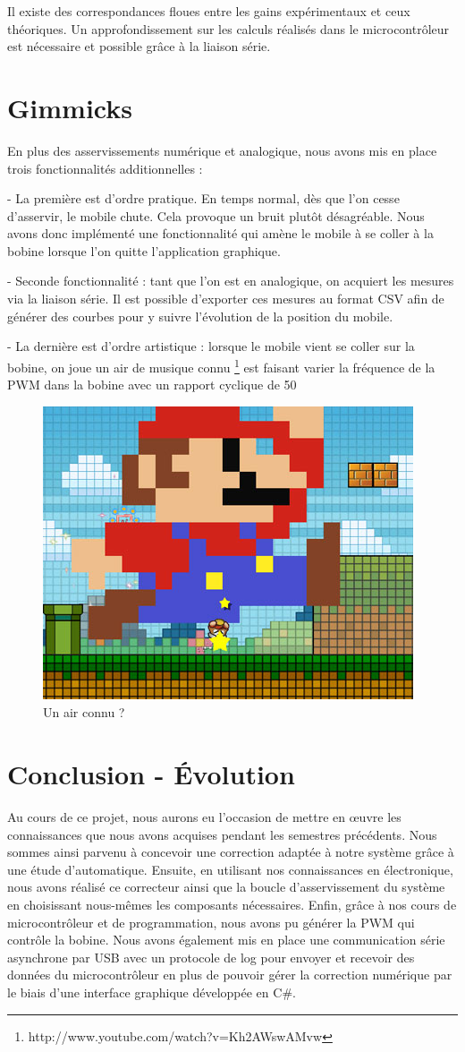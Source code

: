 \documentclass[11pt, french]{article} %
\begin{document}
Il existe des correspondances floues entre les gains expérimentaux et ceux théoriques. Un approfondissement sur les calculs réalisés dans le microcontrôleur est nécessaire et possible grâce à la liaison série.

\section{Gimmicks}
 
 En plus des asservissements numérique et analogique, nous avons mis en place trois fonctionnalités additionnelles :
 
 \medskip
 
 - La première est d'ordre pratique. En temps normal, dès que l'on cesse d'asservir, le mobile chute. Cela provoque un bruit plutôt désagréable. Nous avons donc implémenté une fonctionnalité qui amène le mobile à se coller à la bobine lorsque l'on quitte l'application graphique. 
 
 - Seconde fonctionnalité : tant que l'on est en analogique, on acquiert les mesures via la liaison série. Il est possible d'exporter ces mesures au format CSV afin de générer des courbes pour y suivre l'évolution de la position du mobile.
 
  - La dernière est d'ordre artistique : lorsque le mobile vient se coller sur la bobine, on joue un air de musique connu \footnote{http://www.youtube.com/watch?v=Kh2AWswAMvw} est faisant varier la fréquence de la PWM dans la bobine avec un rapport cyclique de 50%
  
\begin{figure}[h!]
	\centering
	\includegraphics[width = 4 cm]{SolutionNumerique/mario.png} 
	\caption{Un air connu ?}
\end{figure}
 
 \pagebreak
\section*{Conclusion - Évolution}

Au cours de ce projet, nous aurons eu l'occasion de mettre en œuvre les connaissances que nous avons acquises pendant les semestres précédents. Nous sommes ainsi parvenu à concevoir une correction adaptée à notre système grâce à une étude d'automatique. Ensuite, en utilisant nos connaissances en électronique, nous avons réalisé ce correcteur ainsi que la boucle d'asservissement du système en choisissant nous-mêmes les composants nécessaires. Enfin, grâce à nos cours de microcontrôleur et de programmation, nous avons pu générer la PWM qui contrôle la bobine. Nous avons également mis en place une communication série asynchrone par USB avec un protocole de log pour envoyer et recevoir des données du microcontrôleur en plus de pouvoir gérer la correction numérique par le biais d'une interface graphique développée en C\#. 
\end{document}

